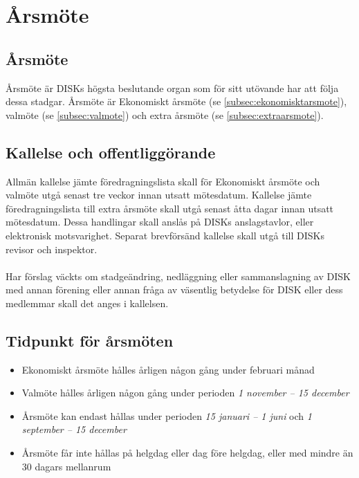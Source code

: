 \clearpage
\section{Årsmöte}
\label{sec:arsmote}

	\subsection{Årsmöte}
	\label{subsec:arsmote}
		Årsmöte är DISKs högsta beslutande organ som för sitt utövande har att följa dessa stadgar. Årsmöte är Ekonomiskt årsmöte (se \ref{subsec:ekonomisktarsmote}), valmöte (se \ref{subsec:valmote}) och extra årsmöte (se \ref{subsec:extraarsmote}).

	\subsection{Kallelse och offentliggörande}
	\label{subsec:kallelseochoffentliggorande}
		Allmän kallelse jämte föredragningslista skall för Ekonomiskt årsmöte och valmöte utgå senast tre veckor innan utsatt mötesdatum. Kallelse jämte föredragningslista till extra årsmöte skall utgå senast åtta dagar innan utsatt mötesdatum. Dessa handlingar skall anslås på DISKs anslagstavlor, eller elektronisk motsvarighet. Separat brevförsänd kallelse skall utgå till DISKs revisor och inspektor.\\ \\
		Har förslag väckts om stadgeändring, nedläggning eller sammanslagning av DISK med annan förening eller annan fråga av väsentlig betydelse för DISK eller dess medlemmar skall det anges i kallelsen.

	\subsection{Tidpunkt för årsmöten}
	\label{subsec:tidpunktforarsmoten}
		\begin{itemize}
		\setlength{\itemsep}{0.0cm}
		\setlength{\parskip}{0.0cm}
			\item Ekonomiskt årsmöte hålles årligen någon gång under februari månad
			\item Valmöte hålles årligen någon gång under perioden \emph{1 november – 15 december}
			\item Årsmöte kan endast hållas under perioden \emph{15 januari – 1 juni} och \emph{1 september – 15 december}
			\item Årsmöte får inte hållas på helgdag eller dag före helgdag, eller med mindre än 30 dagars mellanrum
		\end{itemize}


